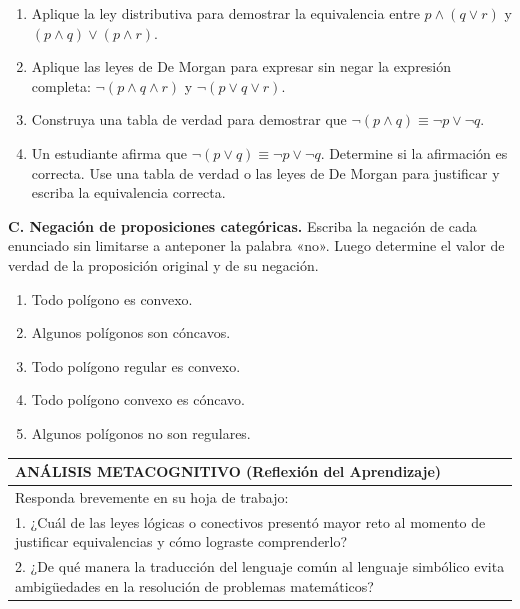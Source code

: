 \documentclass[11pt, letterpaper]{article}
\begin{document}
\begin{enumerate}[label=\textbf{\arabic*.}, start=6, itemsep=0.25cm]
    \item Aplique la ley distributiva para demostrar la equivalencia entre $p \land (q \lor r)$ y $(p \land q) \lor (p \land r)$.
    \item Aplique las leyes de De Morgan para expresar sin negar la expresión completa: $\neg(p \land q \land r)$ y $\neg(p \lor q \lor r)$.
    \item Construya una tabla de verdad para demostrar que $\neg(p \land q) \equiv \neg p \lor \neg q$.
    \item Un estudiante afirma que $\neg(p \lor q) \equiv \neg p \lor \neg q$. Determine si la afirmación es correcta. Use una tabla de verdad o las leyes de De Morgan para justificar y escriba la equivalencia correcta.
\end{enumerate}

\vspace{0.2cm}
\noindent \textbf{C. Negación de proposiciones categóricas.} Escriba la negación de cada enunciado sin limitarse a anteponer la palabra «no». Luego determine el valor de verdad de la proposición original y de su negación.

\begin{enumerate}[label=\textbf{\arabic*.}, start=10, itemsep=0.25cm]
    \item Todo polígono es convexo.
    \item Algunos polígonos son cóncavos.
    \item Todo polígono regular es convexo.
    \item Todo polígono convexo es cóncavo.
    \item Algunos polígonos no son regulares.
\end{enumerate}

\vspace{0.4cm}

\noindent
\begin{tabularx}{\textwidth}{|X|}
\hline
\rowcolor{GrisTabla}
\textbf{\color{AzulMontano} ANÁLISIS METACOGNITIVO (Reflexión del Aprendizaje)} \\
\hline
Responda brevemente en su hoja de trabajo: \\
1. ¿Cuál de las leyes lógicas o conectivos presentó mayor reto al momento de justificar equivalencias y cómo lograste comprenderlo? \\
2. ¿De qué manera la traducción del lenguaje común al lenguaje simbólico evita ambigüedades en la resolución de problemas matemáticos? \\
\hline
\end{tabularx}
\end{document}
